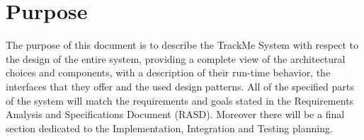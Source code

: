 \section{Purpose}
The purpose of this document is to describe the TrackMe System with respect to the design of the entire system, providing a complete view of the architectural choices and components, with a description of their run-time behavior, the interfaces that they offer and the used design patterns. All of the specified parts of the system will match the requirements and goals stated in the Requirements Analysis and Specifications Document (RASD). Moreover there will be a final section dedicated to the Implementation, Integration and Testing planning.